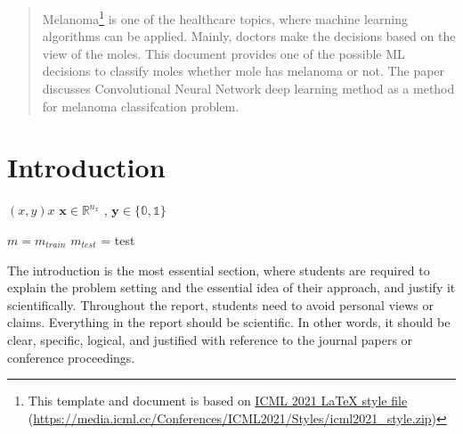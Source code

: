 \documentclass{article}
\begin{document}

\begin{abstract}
Melanoma\footnote{This template and document is based on \href{https://media.icml.cc/Conferences/ICML2021/Styles/icml2021\_style.zip}{ICML 2021 LaTeX style file} (\url{https://media.icml.cc/Conferences/ICML2021/Styles/icml2021\_style.zip})} is one of the healthcare topics, where machine learning algorithms can be applied. Mainly, doctors make the decisions based on the view of the moles. This document provides one of the possible ML decisions to classify moles whether mole has melanoma or not. The paper discusses Convolutional Neural Network deep learning method as a method for melanoma classifcation problem.
\end{abstract}

\section{Introduction}


\((x, y) x \)   $\boldsymbol{x} \in \mathbb{R}^{n_{x}}$ , $\boldsymbol{y} \in \mathbb{\{0, 1\}}$

$m = m_{train}$
$m_{test}$ = test

The introduction is the most essential section, where students are required to explain the problem setting and the essential idea of their approach, and justify it scientifically.
Throughout the report, students need to avoid personal views or claims. Everything in the report should be scientific. 
In other words, it should be clear, specific, logical, and justified with reference to the journal papers or conference proceedings.
\end{document}
